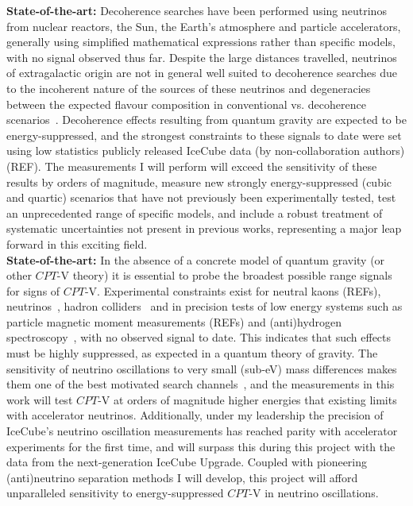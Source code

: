\documentclass[a4paper,11pt]{article}
\begin{document}
\textbf{State-of-the-art:} Decoherence searches have been performed using neutrinos from nuclear reactors, the Sun, the Earth's atmosphere and particle accelerators, generally using simplified mathematical expressions rather than specific models, with no signal observed thus far. Despite the large distances travelled, neutrinos of extragalactic origin are not in general well suited to decoherence searches due to the incoherent nature of the sources of these neutrinos and degeneracies between the expected flavour composition in conventional vs. decoherence scenarios~\cite{PhysRevD.102.115003}. Decoherence effects resulting from quantum gravity are expected to be energy-suppressed, and the strongest constraints to these signals to date were set using low statistics publicly released IceCube data (by non-collaboration authors) (REF). The measurements I will perform will exceed the sensitivity of these results by orders of magnitude, measure new strongly energy-suppressed (cubic and quartic) scenarios that have not previously been experimentally tested, test an unprecedented range of specific models, and include a robust treatment of systematic uncertainties not present in previous works, representing a major leap forward in this exciting field. \\

\noindent \textbf{State-of-the-art:} In the absence of a concrete model of quantum gravity (or other $CPT$-V theory) it is essential to probe the broadest possible range signals~\cite{hep-ph/9809542} for signs of $CPT$-V. Experimental constraints exist for neutral kaons (REFs), neutrinos~\cite{Adamson:2013whj, Ohlsson:2014cha}, hadron colliders~\cite{vanTilburg:2016awx} and in precision tests of low energy systems such as particle magnetic moment measurements (REFs) and (anti)hydrogen spectroscopy~\cite{Kostelecky:2015nma}, with no observed signal to date. This indicates that such effects must be highly suppressed, as expected in a quantum theory of gravity. The sensitivity of neutrino oscillations to very small (sub-eV) mass differences makes them one of the best motivated search channels~\cite{PhysRevD.99.075022}, and the measurements in this work will test $CPT$-V at orders of magnitude higher energies that existing limits with accelerator neutrinos. Additionally, under my leadership the precision of IceCube's neutrino oscillation measurements has reached parity with accelerator experiments for the first time, and will surpass this during this project with the data from the next-generation IceCube Upgrade. Coupled with pioneering (anti)neutrino separation methods I will develop, this project will afford unparalleled sensitivity to energy-suppressed $CPT$-V in neutrino oscillations. \\
\end{document}

